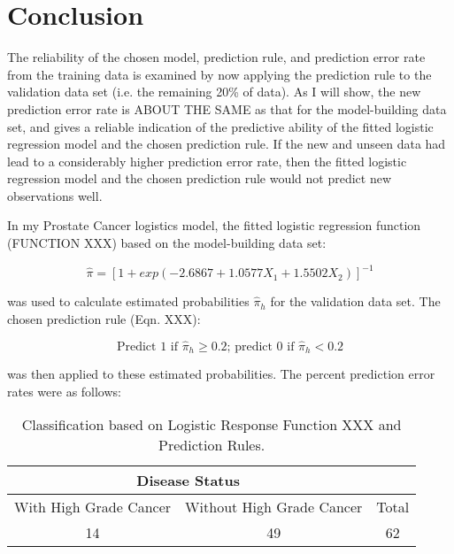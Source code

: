 %
%
%

\section{Conclusion}
The reliability of the chosen model, prediction rule, and prediction error rate from the training data is examined by now applying the prediction rule to the validation data set (i.e. the remaining 20\% of data). As I will show, the new prediction error rate is ABOUT THE SAME as that for the model-building data set, and gives a reliable indication of the predictive ability of the fitted logistic regression model and the chosen prediction rule. If the new and unseen data had lead to a considerably higher prediction error rate, then the fitted logistic regression model and the chosen prediction rule would not predict new observations well. \par

In my Prostate Cancer logistics model, the fitted logistic regression function (FUNCTION XXX) based on the model-building data set:

\begin{equation}
\hat{\pi}=[ 1+ exp(-2.6867 + 1.0577X_1 + 1.5502X_2)]^{-1}
\end{equation}

was used to calculate estimated probabilities \(\hat{\pi}_h\) for the validation data set. The chosen prediction rule (Eqn. XXX):

\begin{equation}
	\textrm{Predict 1 if } \hat{\pi}_h \geq 0.2\textrm{; predict 0 if } \hat{\pi}_h < 0.2
\end{equation}

was then applied to these estimated probabilities. The percent prediction error rates were as follows:

\begin{table}[H]
	\centering
	\begin{tabular}{ |c|c|c| }
 	\multicolumn{2}{c}{Disease Status} \\
 	\hline
 	With High Grade Cancer&Without High Grade Cancer&Total\\
 	14&49&62\\
 	\hline
	\end{tabular}
 	\caption{Classification based on Logistic Response Function XXX and Prediction Rules.}
\end{table}

